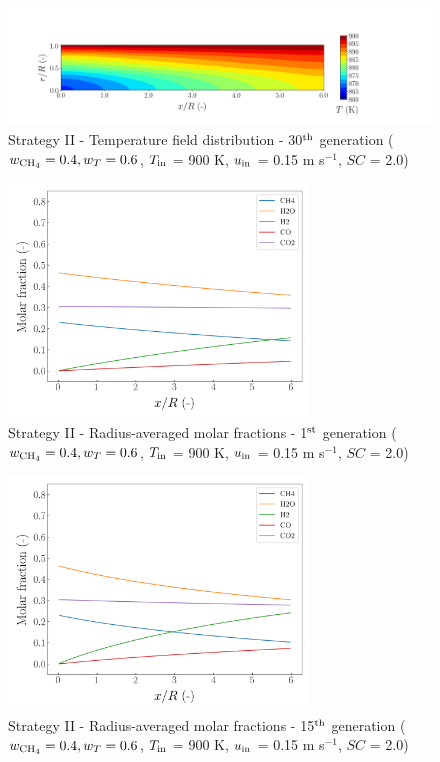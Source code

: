 \documentclass[preprint,12pt]{elsarticle}
\begin{document}
\begin{figure}[h!]
\centering
\includegraphics[width=190mm]{results/5Eq/40C_60T/GEN30-TFIELD.png}
\caption{\label{fig:5RES4060G30-TField} Strategy II - Temperature field distribution - 30$^{\rm{th}}$ generation ($w_{\rm{CH_4}} = 0.4, w_T = 0.6$, $T_{\rm{in}}$ = 900 K, $u_{\rm{in}}$ = 0.15 m s$^{-1}$, $SC$ = 2.0)}
\end{figure}


\begin{figure}[h!]
\centering
\includegraphics[width=80mm]{results/5Eq/40C_60T/GEN1-AVG.png}
\caption{\label{fig:5RES4060G1-avg} Strategy II - Radius-averaged molar fractions - 1$^{\rm{st}}$ generation ($w_{\rm{CH_4}} = 0.4, w_T = 0.6$, $T_{\rm{in}}$ = 900 K, $u_{\rm{in}}$ = 0.15 m s$^{-1}$, $SC$ = 2.0)}
\end{figure}

\begin{figure}[h!]
\centering
\includegraphics[width=80mm]{results/5Eq/40C_60T/GEN15-AVG.png}
\caption{\label{fig:5RES4060G15-avg} Strategy II - Radius-averaged molar fractions - 15$^{\rm{th}}$ generation ($w_{\rm{CH_4}} = 0.4, w_T = 0.6$, $T_{\rm{in}}$ = 900 K, $u_{\rm{in}}$ = 0.15 m s$^{-1}$, $SC$ = 2.0)}
\end{figure}
\end{document}

